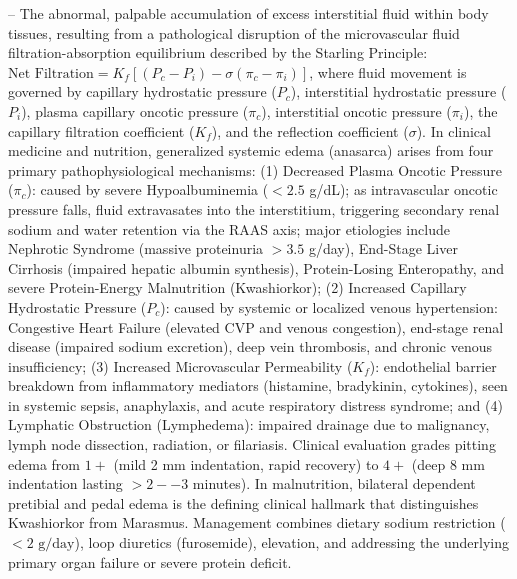 -- The abnormal, palpable accumulation of excess interstitial fluid within body tissues, resulting from a pathological disruption of the microvascular fluid filtration-absorption equilibrium described by the Starling Principle: $\text{Net Filtration} = K_f [ (P_c - P_i) - \sigma (\pi_c - \pi_i) ]$, where fluid movement is governed by capillary hydrostatic pressure ($P_c$), interstitial hydrostatic pressure ($P_i$), plasma capillary oncotic pressure ($\pi_c$), interstitial oncotic pressure ($\pi_i$), the capillary filtration coefficient ($K_f$), and the reflection coefficient ($\sigma$). In clinical medicine and nutrition, generalized systemic edema (anasarca) arises from four primary pathophysiological mechanisms: (1) Decreased Plasma Oncotic Pressure ($\pi_c$): caused by severe Hypoalbuminemia ($<2.5$ g/dL); as intravascular oncotic pressure falls, fluid extravasates into the interstitium, triggering secondary renal sodium and water retention via the RAAS axis; major etiologies include Nephrotic Syndrome (massive proteinuria $>3.5$ g/day), End-Stage Liver Cirrhosis (impaired hepatic albumin synthesis), Protein-Losing Enteropathy, and severe Protein-Energy Malnutrition (Kwashiorkor); (2) Increased Capillary Hydrostatic Pressure ($P_c$): caused by systemic or localized venous hypertension: Congestive Heart Failure (elevated CVP and venous congestion), end-stage renal disease (impaired sodium excretion), deep vein thrombosis, and chronic venous insufficiency; (3) Increased Microvascular Permeability ($K_f$): endothelial barrier breakdown from inflammatory mediators (histamine, bradykinin, cytokines), seen in systemic sepsis, anaphylaxis, and acute respiratory distress syndrome; and (4) Lymphatic Obstruction (Lymphedema): impaired drainage due to malignancy, lymph node dissection, radiation, or filariasis. Clinical evaluation grades pitting edema from $1+$ (mild 2 mm indentation, rapid recovery) to $4+$ (deep 8 mm indentation lasting $>2--3$ minutes). In malnutrition, bilateral dependent pretibial and pedal edema is the defining clinical hallmark that distinguishes Kwashiorkor from Marasmus. Management combines dietary sodium restriction ($<2\text{ g/day}$), loop diuretics (furosemide), elevation, and addressing the underlying primary organ failure or severe protein deficit.

